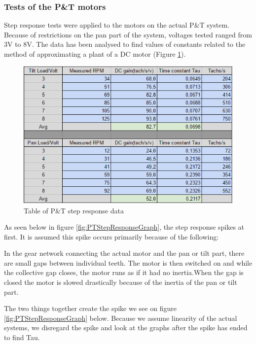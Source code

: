 \subsubsection{Tests of the P\&T motors}
Step response tests were applied to the motors on the actual P\&T system. Because of restrictions on the pan part of the system, voltages tested ranged from 3V to 8V. The data has been analysed to find values of constants related to the method of approximating a plant of a DC motor (Figure \ref{fig:PanTiltStepDataTable}).

\begin{figure}[h!]
\centering
\includegraphics[scale=0.6]{Billeder/PanTiltStepDataTable.png}
\caption{Table of P\&T step response data}
\label{fig:PanTiltStepDataTable}
\end{figure}

As seen below in figure \ref{fig:PTStepResponseGraph}, the step response spikes at first. It is assumed this spike occurs primarily because of the following:

In the gear network connecting the actual motor and the pan or tilt part, there are small gaps between individual teeth. The motor is then switched on and while the collective gap closes, the motor runs as if it had no inertia.When the gap is closed the motor is slowed drastically because of the inertia of the pan or tilt part. 

The two things together create the spike we see on figure \ref{fig:PTStepResponseGraph} below. Because we assume linearity of the actual systems, we disregard the spike and look at the graphs after the spike has ended to find Tau.

